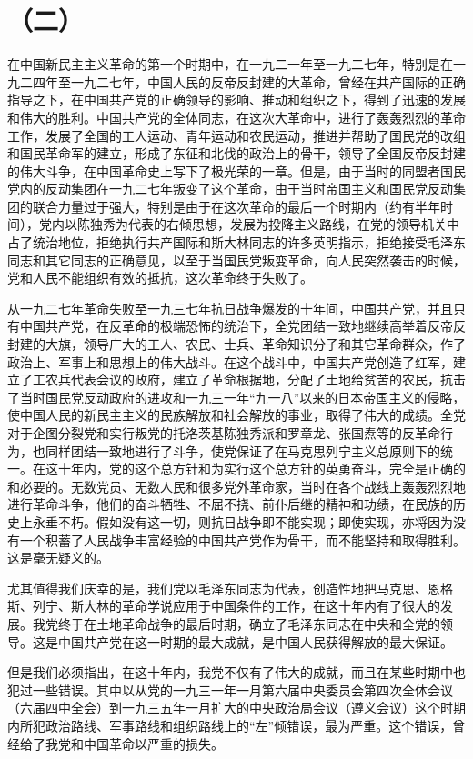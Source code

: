 \section*{（二）}

在中国新民主主义革命的第一个时期中，在一九二一年至一九二七年，特别是在一九二四年至一九二七年，中国人民的反帝反封建的大革命，曾经在共产国际的正确指导之下，在中国共产党的正确领导的影响、推动和组织之下，得到了迅速的发展和伟大的胜利。中国共产党的全体同志，在这次大革命中，进行了轰轰烈烈的革命工作，发展了全国的工人运动、青年运动和农民运动，推进并帮助了国民党的改组和国民革命军的建立，形成了东征和北伐的政治上的骨干，领导了全国反帝反封建的伟大斗争，在中国革命史上写下了极光荣的一章。但是，由于当时的同盟者国民党内的反动集团在一九二七年叛变了这个革命，由于当时帝国主义和国民党反动集团的联合力量过于强大，特别是由于在这次革命的最后一个时期内（约有半年时间），党内以陈独秀为代表的右倾思想，发展为投降主义路线，在党的领导机关中占了统治地位，拒绝执行共产国际和斯大林同志的许多英明指示，拒绝接受毛泽东同志和其它同志的正确意见，以至于当国民党叛变革命，向人民突然袭击的时候，党和人民不能组织有效的抵抗，这次革命终于失败了。

从一九二七年革命失败至一九三七年抗日战争爆发的十年间，中国共产党，并且只有中国共产党，在反革命的极端恐怖的统治下，全党团结一致地继续高举着反帝反封建的大旗，领导广大的工人、农民、士兵、革命知识分子和其它革命群众，作了政治上、军事上和思想上的伟大战斗。在这个战斗中，中国共产党创造了红军，建立了工农兵代表会议的政府，建立了革命根据地，分配了土地给贫苦的农民，抗击了当时国民党反动政府的进攻和一九三一年“九一八”以来的日本帝国主义的侵略，使中国人民的新民主主义的民族解放和社会解放的事业，取得了伟大的成绩。全党对于企图分裂党和实行叛党的托洛茨基陈独秀派和罗章龙、张国焘等的反革命行为，也同样团结一致地进行了斗争，使党保证了在马克思列宁主义总原则下的统一。在这十年内，党的这个总方针和为实行这个总方针的英勇奋斗，完全是正确的和必要的。无数党员、无数人民和很多党外革命家，当时在各个战线上轰轰烈烈地进行革命斗争，他们的奋斗牺牲、不屈不挠、前仆后继的精神和功绩，在民族的历史上永垂不朽。假如没有这一切，则抗日战争即不能实现；即使实现，亦将因为没有一个积蓄了人民战争丰富经验的中国共产党作为骨干，而不能坚持和取得胜利。这是毫无疑义的。

尤其值得我们庆幸的是，我们党以毛泽东同志为代表，创造性地把马克思、恩格斯、列宁、斯大林的革命学说应用于中国条件的工作，在这十年内有了很大的发展。我党终于在土地革命战争的最后时期，确立了毛泽东同志在中央和全党的领导。这是中国共产党在这一时期的最大成就，是中国人民获得解放的最大保证。

但是我们必须指出，在这十年内，我党不仅有了伟大的成就，而且在某些时期中也犯过一些错误。其中以从党的一九三一年一月第六届中央委员会第四次全体会议（六届四中全会）到一九三五年一月扩大的中央政治局会议（遵义会议）这个时期内所犯政治路线、军事路线和组织路线上的“左”倾错误，最为严重。这个错误，曾经给了我党和中国革命以严重的损失。

